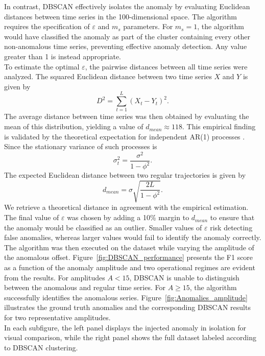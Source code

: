 \documentclass[prl,twocolumn]{revtex4-1}
\begin{document}
\noindent In contrast, DBSCAN effectively isolates the anomaly by evaluating Euclidean distances between time series in the 100-dimensional space.
The algorithm requires the specification of $\varepsilon$ and $m_s$ parameters.
For $m_s=1$, the algorithm would have classified the anomaly as part of the cluster containing every other non-anomalous time series, preventing effective anomaly detection.
Any value greater than 1 is instead appropriate. \\
To estimate the optimal $\varepsilon$, the pairwise distances between all time series were analyzed. The squared Euclidean distance between two time series $X$ and $Y$ is given by
\begin{equation}
    D^2=\sum_{t=1}^L(X_t-Y_t)^2.
\end{equation} 
The average distance between time series was then obtained by evaluating the mean of this distribution, yielding a value of $d_{mean}\approx118$.
This empirical finding is validated by the theoretical expectation for independent AR(1) processes \cite{hamilton1994time}. Since the stationary variance of such processes is 
\begin{equation}
\sigma_t^2 = \frac{\sigma^2}{1-\phi^2}.
\end{equation}
The expected Euclidean distance between two regular trajectories is given by
\begin{equation}
    d_{mean}=\sigma\sqrt{\frac{2L}{1-\phi^2}}.
\end{equation}
We retrieve a theoretical distance in agreement with the empirical estimation.
The final value of $\varepsilon$ was chosen by adding a 10\% margin to $d_{mean}$ to ensure that the anomaly would be classified as an outlier.
Smaller values of $\varepsilon$ risk detecting false anomalies, whereas larger values would fail to identify the anomaly correctly.\\
\noindent The algorithm was then executed on the dataset while varying the amplitude of the anomalous offset.
Figure~\ref{fig:DBSCAN_performance} presents the F1 score as a function of the anomaly amplitude and two operational regimes are evident from the results.
For amplitudes $A<15$, DBSCAN is unable to distinguish between the anomalous and regular time series.
For $A\ge 15$, the algorithm successfully identifies the anomalous series. Figure~\ref{fig:Anomalies_amplitude} illustrates the ground truth anomalies and the corresponding DBSCAN results for two representative amplitudes.\\
\noindent In each subfigure, the left panel displays the injected anomaly in isolation for visual comparison, while the right panel shows the full dataset labeled according to DBSCAN clustering.
\end{document}

